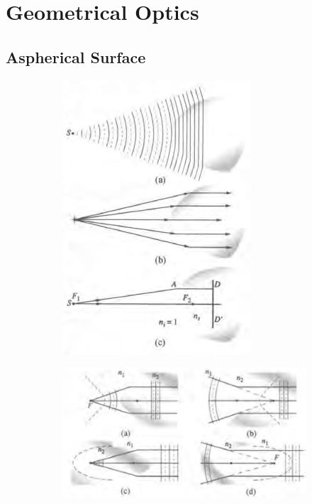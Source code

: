 \chapter{Geometrical Optics}

\section{Aspherical Surface}

\begin{figure}[H]
  \centering
  \begin{subfigure}{.25\textwidth}
    \centering
    \includegraphics[width=\linewidth]{figures/hyperbolic-surf.png}
  \end{subfigure}
  \begin{subfigure}{.65\textwidth}
    \centering
    \includegraphics[width=\linewidth]{figures/ellipsoidal-surf.png}

\end{subfigure}
\end{figure}
